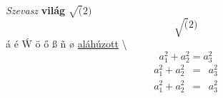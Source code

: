 \documentclass[]{article}
\begin{document}
\textit{Szevasz} \textbf{világ} $\sqrt(2)$
 $$\sqrt(2)$$
 \'a \'e \'W
 \"o
 \H{o}
 \ss
 \~n
 \o
 \underline{aláhúzott}
\textbackslash
\begin{equation}
	a_1^2+a_2^2=a_3^2
\end{equation}
\begin{eqnarray}
	a_1^2+a_2^2&=&a_3^2\\
	a_1^2+a_2^2&=&a_3^2
\end{eqnarray}
\iffalse
Ez a rész egy komment
és többsoros.
\fi
\begin{flushleft}
	\blindtext
\end{flushleft}
\begin{center}
	\blindtext
\end{center}
\end{document}
